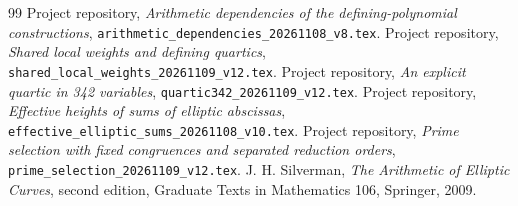 \documentclass[11pt,a4paper]{article}
\theoremstyle{remark}\newtheorem{remark}[theorem]{Remark}
\begin{document}
\begin{thebibliography}{99}
 Project repository,
\emph{Arithmetic dependencies of the defining-polynomial constructions},
\nolinkurl{arithmetic_dependencies_20261108_v8.tex}.
 Project repository,
\emph{Shared local weights and defining quartics},
\nolinkurl{shared_local_weights_20261109_v12.tex}.
 Project repository,
\emph{An explicit quartic in 342 variables},
\nolinkurl{quartic342_20261109_v12.tex}.
 Project repository,
\emph{Effective heights of sums of elliptic abscissas},
\nolinkurl{effective_elliptic_sums_20261108_v10.tex}.
 Project repository,
\emph{Prime selection with fixed congruences and separated reduction orders},
\nolinkurl{prime_selection_20261109_v12.tex}.
 J. H. Silverman,
\emph{The Arithmetic of Elliptic Curves}, second edition,
Graduate Texts in Mathematics 106, Springer, 2009.
\end{thebibliography}
\end{document}
